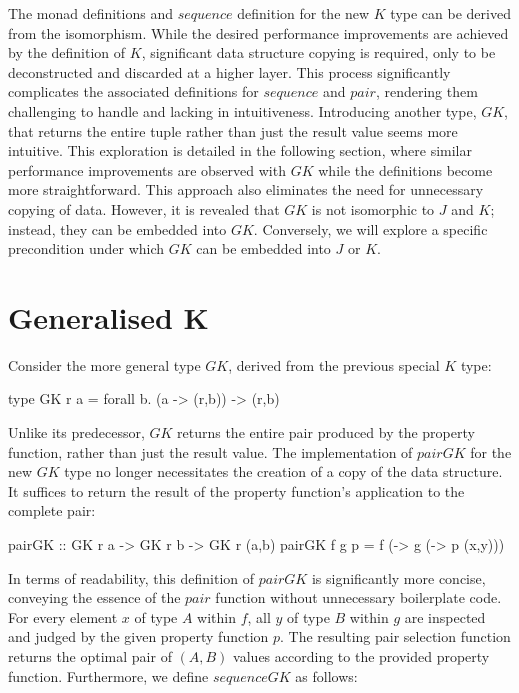 \documentclass[runningheads]{llncs}
\begin{document}
The monad definitions and \(sequence\) definition for the new \(K\) type
can be derived from the isomorphism. While the desired performance
improvements are achieved by the definition of \(K\), significant data
structure copying is required, only to be deconstructed and discarded at
a higher layer. This process significantly complicates the associated
definitions for \(sequence\) and \(pair\), rendering them challenging to
handle and lacking in intuitiveness. Introducing another type, \(GK\),
that returns the entire tuple rather than just the result value seems
more intuitive. This exploration is detailed in the following section,
where similar performance improvements are observed with \(GK\) while
the definitions become more straightforward. This approach also
eliminates the need for unnecessary copying of data. However, it is
revealed that \(GK\) is not isomorphic to \(J\) and \(K\); instead, they
can be embedded into \(GK\). Conversely, we will explore a specific
precondition under which \(GK\) can be embedded into \(J\) or \(K\).

\section{Generalised K}\label{generalised-k}

Consider the more general type \(GK\), derived from the previous special
\(K\) type:

\begin{code}
type GK r a = forall b. (a -> (r,b)) -> (r,b)
\end{code}

Unlike its predecessor, \(GK\) returns the entire pair produced by the
property function, rather than just the result value. The implementation
of \(pairGK\) for the new \(GK\) type no longer necessitates the
creation of a copy of the data structure. It suffices to return the
result of the property function's application to the complete pair:

\begin{code}
pairGK :: GK r a -> GK r b -> GK r (a,b)
pairGK f g p = f (\x -> g (\y -> p (x,y)))
\end{code}

In terms of readability, this definition of \(pairGK\) is significantly
more concise, conveying the essence of the \(pair\) function without
unnecessary boilerplate code. For every element \(x\) of type \(A\)
within \(f\), all \(y\) of type \(B\) within \(g\) are inspected and
judged by the given property function \(p\). The resulting pair
selection function returns the optimal pair of \((A,B)\) values
according to the provided property function. Furthermore, we define
\(sequenceGK\) as follows:
\end{document}
